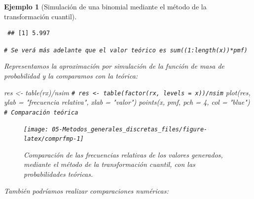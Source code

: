 \documentclass[
  10pt,
]{book}
\newenvironment{Shaded}{\begin{snugshade}}{\end{snugshade}}
\newcommand{\AttributeTok}[1]{\textcolor[rgb]{0.77,0.63,0.00}{#1}}
\newcommand{\CommentTok}[1]{\textcolor[rgb]{0.56,0.35,0.01}{\textit{#1}}}
\newcommand{\DecValTok}[1]{\textcolor[rgb]{0.00,0.00,0.81}{#1}}
\newcommand{\FunctionTok}[1]{\textcolor[rgb]{0.00,0.00,0.00}{#1}}
\newcommand{\NormalTok}[1]{#1}
\newcommand{\OtherTok}[1]{\textcolor[rgb]{0.56,0.35,0.01}{#1}}
\newcommand{\SpecialCharTok}[1]{\textcolor[rgb]{0.00,0.00,0.00}{#1}}
\newcommand{\StringTok}[1]{\textcolor[rgb]{0.31,0.60,0.02}{#1}}
\theoremstyle{break}
\newtheorem{example}{Ejemplo}[chapter]
\theoremstyle{nonumberplain}
\renewcommand{\CommentTok}[1]{\textcolor[rgb]{0.41,0.41,0.41}{\texttt{#1}}}
\begin{document}
\begin{example}[Simulación de una binomial mediante el método de la transformación cuantil]
\begin{verbatim}
 ## [1] 5.997
\end{verbatim}

\begin{Shaded}
\begin{Highlighting}[]
\CommentTok{\# Se verá más adelante que el valor teórico es sum((1:length(x))*pmf)}
\end{Highlighting}
\end{Shaded}

Representamos la aproximación por simulación de la función de masa de probabilidad y la comparamos con la teórica:

\begin{Shaded}
\begin{Highlighting}[]
\NormalTok{res }\OtherTok{\textless{}{-}} \FunctionTok{table}\NormalTok{(rx)}\SpecialCharTok{/}\NormalTok{nsim}
\CommentTok{\# res \textless{}{-} table(factor(rx, levels = x))/nsim}
\FunctionTok{plot}\NormalTok{(res, }\AttributeTok{ylab =} \StringTok{"frecuencia relativa"}\NormalTok{, }\AttributeTok{xlab =} \StringTok{"valor"}\NormalTok{)}
\FunctionTok{points}\NormalTok{(x, pmf, }\AttributeTok{pch =} \DecValTok{4}\NormalTok{, }\AttributeTok{col =} \StringTok{"blue"}\NormalTok{)  }\CommentTok{\# Comparación teórica}
\end{Highlighting}
\end{Shaded}

\begin{figure}[!htbp]

{\centering \texttt{[image: 05-Metodos\_generales\_discretas\_files/figure-latex/comprfmp-1]} 

}

\caption{Comparación de las frecuencias relativas de los valores generados, mediante el método de la transformación cuantil, con las probabilidades teóricas.}\label{fig:comprfmp}
\end{figure}

También podríamos realizar comparaciones numéricas:

\begin{Shaded}
\end{Shaded}


\end{example}
\end{document}
